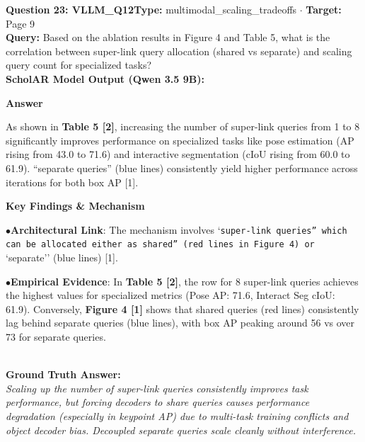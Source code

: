 \documentclass[10pt,a4paper]{article}
\begin{document}
\begin{tcolorbox}[questionbox]
{\noindent\bfseries\large\color{navy} Question 23: VLLM\_Q12}\hfill {\footnotesize\color{darkteal}\textbf{Type:} multimodal\_scaling\_tradeoffs $\cdot$ \textbf{Target:} Page 9}\\[4pt]
{\noindent\bfseries\color{accentblue} Query: } Based on the ablation results in Figure 4 and Table 5, what is the correlation between super-link query allocation (shared vs separate) and scaling query count for specialized tasks?\\[6pt]
{\noindent\bfseries\color{navy} ScholAR Model Output (Qwen 3.5 9B):}\\[2pt]
{\small \noindent \textbf{Answer}\par\vspace{3pt}As shown in \textbf{Table 5 [2]}, increasing the number of super-link queries from 1 to 8 significantly improves performance on specialized tasks like pose estimation (AP rising from 43.0 to 71.6) and interactive segmentation (cIoU rising from 60.0 to 61.9). ``separate queries'' (blue lines) consistently yield higher performance across iterations for both box AP [1].\par\vspace{3pt}\noindent \textbf{Key Findings \& Mechanism}\par\vspace{3pt}\noindent\hspace*{8pt}$\bullet$\hspace*{4pt}\textbf{Architectural Link}: The mechanism involves `\texttt{super-link queries'' which can be allocated either as }\texttt{shared'' (red lines in Figure 4) or }`separate'' (blue lines) [1].\par\vspace{3pt}\noindent\hspace*{8pt}$\bullet$\hspace*{4pt}\textbf{Empirical Evidence}: In \textbf{Table 5 [2]}, the row for 8 super-link queries achieves the highest values for specialized metrics (Pose AP: 71.6, Interact Seg cIoU: 61.9). Conversely, \textbf{Figure 4 [1]} shows that shared queries (red lines) consistently lag behind separate queries (blue lines), with box AP peaking around 56 vs over 73 for separate queries.}\\[6pt]
{\noindent\bfseries\color{darkteal} Ground Truth Answer:}\\[2pt]
{\small\itshape Scaling up the number of super-link queries consistently improves task performance, but forcing decoders to share queries causes performance degradation (especially in keypoint AP) due to multi-task training conflicts and object decoder bias. Decoupled separate queries scale cleanly without interference.}\\[4pt]

\end{tcolorbox}
\end{document}
